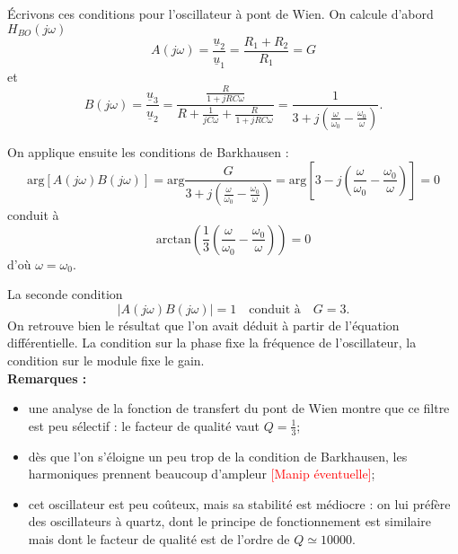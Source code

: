 \documentclass[11pt,a4paper]{report}
\begin{document}
\'Ecrivons ces conditions pour l'oscillateur à pont de Wien. On calcule d'abord $H_{BO}(j\omega)$
\begin{equation}
	A(j\omega) = \frac{\underline{u}_2}{\underline{u}_1} = \frac{R_1 + R_2}{R_1} = G
\end{equation}
et 
\begin{equation}
	\displaystyle{B(j\omega) = \frac{\underline{u}_3}{\underline{u}_2} = \frac{\frac{R}{1+jRC\omega}}{R + \frac{1}{jC\omega} + \frac{R}{1 + jRC\omega}} = \frac{1}{3 + j\left(\frac{\omega}{\omega_0}-\frac{\omega_0}{\omega}\right)}}.
\end{equation}

On applique ensuite les conditions de Barkhausen :
\begin{equation}
	\text{arg}[A(j\omega)B(j\omega)] = \text{arg}\frac{G}{3 + j\left( \frac{\omega}{\omega_0}-\frac{\omega_0}{\omega}\right)} = \text{arg}\left[3 - j \left(\frac{\omega}{\omega_0}-\frac{\omega_0}{\omega}\right)\right] = 0
\end{equation}
conduit à 
\begin{equation}
	\text{arctan}\left(\frac{1}{3}\left(\frac{\omega}{\omega_0}-\frac{\omega_0}{\omega}\right)\right) = 0
\end{equation}
d'où $\omega = \omega_0$.

La seconde condition
\begin{equation}
	|A(j\omega)B(j\omega)| = 1 \quad\text{conduit à}\quad G = 3.
\end{equation}
On retrouve bien le résultat que l'on avait déduit à partir de l'équation différentielle. La condition sur la phase fixe la fréquence de l'oscillateur, la condition sur le module fixe le gain.\\

\textbf{Remarques :}
\begin{itemize}
	\item une analyse de la fonction de transfert du pont de Wien montre que ce filtre est peu sélectif : le facteur de qualité vaut $Q = \frac{1}{3}$;
	\item dès que l'on s'éloigne un peu trop de la condition de Barkhausen, les harmoniques prennent beaucoup d'ampleur \textcolor{red}{[Manip éventuelle]};
	\item cet oscillateur est peu coûteux, mais sa stabilité est médiocre : on lui préfère des oscillateurs à quartz, dont le principe de fonctionnement est similaire mais dont le facteur de qualité est de l'ordre de $Q \simeq 10000$.
\end{itemize}
\end{document}
